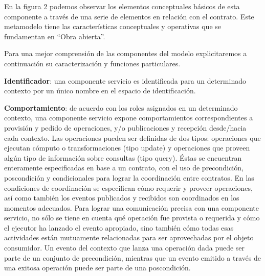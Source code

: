 {En la figura 2 podemos observar los elementos conceptuales básicos de esta
componente a través de una serie de elementos en relación con el contrato.
Este metamodelo tiene las características conceptuales y operativas que se
fundamentan en “Obra abierta”.

Para una mejor comprensión de las componentes del modelo explicitaremos
a continuación su caracterización y funciones particulares.

\textbf{Identificador}: una componente servicio es identificada para un
determinado
contexto por un único nombre en el espacio de identificación.

\textbf{Comportamiento}: de acuerdo con los roles asignados en un determinado
contexto, una componente servicio expone comportamientos correspondientes a
provisión y pedido de operaciones, y/o publicaciones y recepción desde/hacia
cada contexto. Las operaciones pueden ser definidas de dos tipos: operaciones
que ejecutan cómputo o transformaciones (tipo update) y operaciones que proveen
algún tipo de información sobre consultas (tipo query). Éstas se encuentran
enteramente especificadas en base a un contrato, con el uso de precondición,
poscondición y condicionales para lograr la coordinación entre contratos. En las
condiciones de coordinación se especifican cómo requerir y proveer operaciones,
así como también los eventos publicados y recibidos son coordinados en los
momentos adecuados. Para lograr una comunicación precisa con una componente
servicio, no sólo se tiene en cuenta qué operación fue provista o requerida
y cómo el ejecutor ha lanzado el evento apropiado, sino también cómo todas
esas actividades están mutuamente relacionadas para ser aprovechadas por el
objeto consumidor. Un evento del contexto que lanza una operación dada
puede ser parte de un conjunto de precondición, mientras que un evento emitido
a través de una exitosa operación puede ser parte de una poscondición.


}
